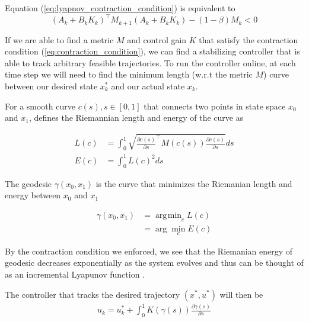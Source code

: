 \documentclass[journal]{IEEEtran}
\DeclareMathOperator*{\argmin}{\arg\!\min}
\begin{document}
Equation (\ref{eq:lyapnov_contraction_condition}) is equivalent to
\begin{equation}
	\label{eq:contraction_condition}
	(A_k + B_k K_k)^\top M_{k+1} (A_k + B_k K_k) - (1 - \beta) M_k < 0
\end{equation}

If we are able to find a metric $M$ and control gain $K$ that satisfy the contraction condition (\ref{eq:contraction_condition}), we can find a stabilizing controller that is able to track arbitrary feasible trajectories. To run the controller online, at each time step we will need to find the minimum length (w.r.t the metric $M$) curve between our desired state $x^*_k$ and our actual state $x_k$.

For a smooth curve $c(s), s\in [0, 1]$ that connects two points in state space $x_0$ and $x_1$, \autocite{manchesterControlContractionMetrics2017} defines the Riemannian length and energy of the curve as

\begin{equation}
	\begin{aligned}
		L(c) &= \int_0^1 \sqrt{\frac{\partial{c(s)}}{\partial{s}} ^\top M(c(s)) \frac{\partial{c(s)}}{\partial{s}}} ds \\
		E(c) &= \int_0^1 L(c)^2 ds
	\end{aligned}
	\label{eq:geodesic_length_energy}
\end{equation}

The geodesic $\gamma(x_0, x_1)$ is the curve that minimizes the Riemanian length and energy between $x_0$ and $x_1$

\begin{equation}
	\begin{aligned}
		\gamma(x_0, x_1) &= \argmin_{c} L(c) \\
		&= \arg \min_{c} E(c)
	\end{aligned}
	\label{eq:geodesic}
\end{equation}

By the contraction condition we enforced, we see that the Riemanian energy of geodesic decreases exponentially as the system evolves and thus can be thought of as an incremental Lyapunov function \autocite{manchesterControlContractionMetrics2017}.

The controller that tracks the desired trajectory $(x^*, u^*)$ will then be
\begin{equation}
	\begin{aligned}
		u_k = u^*_k + \int_0^1 K(\gamma(s))\frac{\partial{\gamma(s)}}{\partial{s}}
	\end{aligned}
	\label{eq:control_integral_geodesic}
\end{equation}
\end{document}

